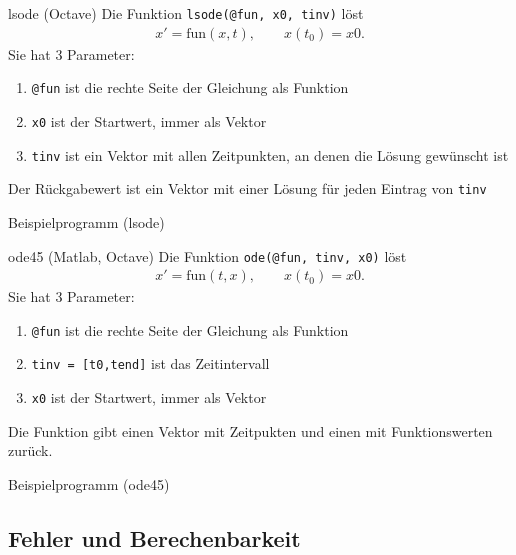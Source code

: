 \begin{frame}{lsode (Octave)}
  Die Funktion \lstinline!lsode(@fun, x0, tinv)! löst
  \begin{gather*}
    x' = \text{fun}(x,t), \qquad x(t_0) = x0.
  \end{gather*}
  Sie hat 3 Parameter:
  \begin{enumerate}
  \item \lstinline!@fun! ist die rechte Seite der Gleichung als Funktion
  \item \lstinline!x0! ist der Startwert, immer als Vektor
  \item \lstinline!tinv! ist ein Vektor mit allen Zeitpunkten, an denen
    die Lösung gewünscht ist
  \end{enumerate}
  Der Rückgabewert ist ein Vektor mit einer Lösung für jeden Eintrag
  von \lstinline!tinv!
\end{frame}

\begin{frame}{Beispielprogramm (lsode)}
  

  
\end{frame}

\begin{frame}{ode45 (Matlab, Octave)}
  Die Funktion \lstinline!ode(@fun, tinv, x0)! löst
  \begin{gather*}
    x' = \text{fun}(t,x), \qquad x(t_0) = x0.
  \end{gather*}
  Sie hat 3 Parameter:
  \begin{enumerate}
  \item \lstinline!@fun! ist die rechte Seite der Gleichung als Funktion
  \item \lstinline!tinv = [t0,tend]! ist das Zeitintervall
  \item \lstinline!x0! ist der Startwert, immer als Vektor
  \end{enumerate}
  Die Funktion gibt einen Vektor mit Zeitpukten und einen mit
  Funktionswerten zurück.
\end{frame}

\begin{frame}{Beispielprogramm (ode45)}
  

  
\end{frame}



\subsection{Fehler und Berechenbarkeit}
\frame{\subtoc}

